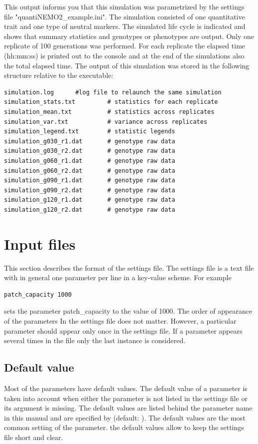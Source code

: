 \documentclass[letterpaper,12pt,oneside]{book}
\begin{document}
This output informs you that this simulation was parametrized by the settings file "quantiNEMO2\_example.ini". The simulation consisted of one quantitative trait and one type of neutral markers. The simulated life cycle is indicated and shows that summary statistics and genotypes or phenotypes are output. Only one replicate of 100 generations was performed. For each replicate the elapsed time (hh:mm:ss) is printed out to the console and at the end of the simulations also the total elapsed time. 
The output of this simulation was stored in the following structure relative to the executable:
\begin{lstlisting}[frame=single]
simulation.log      #log file to relaunch the same simulation
simulation_stats.txt         # statistics for each replicate
simulation_mean.txt          # statistics across replicates
simulation_var.txt           # variance across replicates
simulation_legend.txt        # statistic legends
simulation_g030_r1.dat       # genotype raw data 
simulation_g030_r2.dat       # genotype raw data 
simulation_g060_r1.dat	     # genotype raw data 
simulation_g060_r2.dat       # genotype raw data 
simulation_g090_r1.dat	     # genotype raw data 
simulation_g090_r2.dat       # genotype raw data 
simulation_g120_r1.dat       # genotype raw data 
simulation_g120_r2.dat       # genotype raw data 
\end{lstlisting}
\newpage
\chapter{Input files}\label{chap:InputFiles}
This section describes the format of the settings file. The settings file is a text file with in general one parameter per line in a key-value scheme. For example
\begin{lstlisting}[frame=single]
patch_capacity 1000
\end{lstlisting}
sets the parameter \textsf{patch\_capacity} to the value of 1000. The order of appearance of the parameters In the settings file does not matter. However, a particular parameter should appear only once in the settings file. If a parameter appears several times in the file only the last instance is considered. 

\section{Default value}
Most of the parameters have default values. The default value of a parameter is taken into account when either the parameter is not listed in the settings file or its argument is missing. The default values are listed behind the parameter name in this manual and are specified by \textsf{(default: )}. The default values are the most common setting of the parameter. the default values allow to keep the settings file short and clear.  
\end{document}
